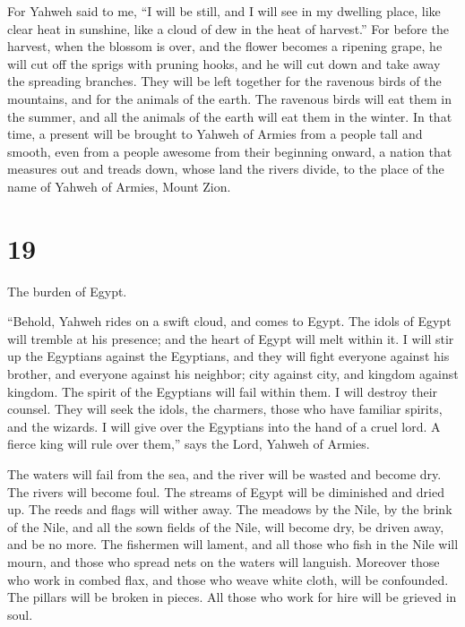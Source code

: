  For Yahweh said to me, ``I will be still, and I will see
in my dwelling place, like clear heat in sunshine, like a cloud of dew
in the heat of harvest.''  For before the harvest, when
the blossom is over, and the flower becomes a ripening grape, he will
cut off the sprigs with pruning hooks, and he will cut down and take
away the spreading branches.  They will be left together
for the ravenous birds of the mountains, and for the animals of the
earth. The ravenous birds will eat them in the summer, and all the
animals of the earth will eat them in the winter.  In that
time, a present will be brought to Yahweh of Armies from a people tall
and smooth, even from a people awesome from their beginning onward, a
nation that measures out and treads down, whose land the rivers divide,
to the place of the name of Yahweh of Armies, Mount Zion.

\hypertarget{section-18}{%
\section{19}\label{section-18}}

 The burden of Egypt.

``Behold, Yahweh rides on a swift cloud, and comes to Egypt. The idols
of Egypt will tremble at his presence; and the heart of Egypt will melt
within it.  I will stir up the Egyptians against the
Egyptians, and they will fight everyone against his brother, and
everyone against his neighbor; city against city, and kingdom against
kingdom.  The spirit of the Egyptians will fail within
them. I will destroy their counsel. They will seek the idols, the
charmers, those who have familiar spirits, and the wizards.
 I will give over the Egyptians into the hand of a cruel
lord. A fierce king will rule over them,'' says the Lord, Yahweh of
Armies.

 The waters will fail from the sea, and the river will be
wasted and become dry.  The rivers will become foul. The
streams of Egypt will be diminished and dried up. The reeds and flags
will wither away.  The meadows by the Nile, by the brink
of the Nile, and all the sown fields of the Nile, will become dry, be
driven away, and be no more.  The fishermen will lament,
and all those who fish in the Nile will mourn, and those who spread nets
on the waters will languish.  Moreover those who work in
combed flax, and those who weave white cloth, will be confounded.
 The pillars will be broken in pieces. All those who work
for hire will be grieved in soul.

